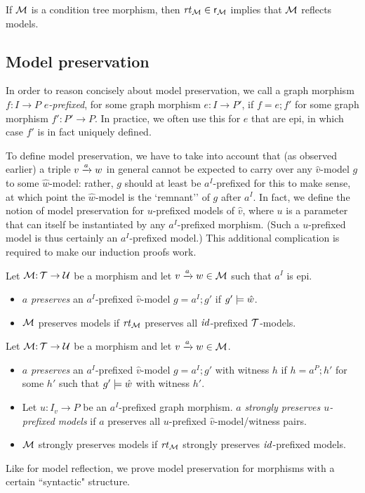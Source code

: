 \begin{corollary}
If ${\mathcal{M}}$ is a condition tree morphism, then $\mathit{rt}_{{\mathcal{M}}}\in {\mathsf{r}}_{\mathcal{M}}$ implies that ${\mathcal{M}}$ reflects models.
\end{corollary}

\subsection{Model preservation}

In order to reason concisely about model preservation, we call a graph morphism $f:I\to P$ \emph{$e$-prefixed}, for some graph morphism $e:I\to P'$, if $f=e;f'$ for some graph morphism $f':P'\to P$. In practice, we often use this for $e$ that are epi, in which case $f'$ is in fact uniquely defined.

To define model preservation, we have to take into account that (as observed earlier) a triple ${v}\xrightarrow{a}{w}$ in general cannot be expected to carry over any $\hat v$-model $g$ to some $\hat w$-model: rather, $g$ should at least be $a^I$-prefixed for this to make sense, at which point the $\hat w$-model is the `remnant'' of $g$ after $a^I$. In fact, we define the notion of model preservation for $u$-prefixed models of $\hat v$, where $u$ is a parameter that can itself be instantiated by any $a^I$-prefixed morphism. (Such a $u$-prefixed model is thus certainly an $a^I$-prefixed model.) This additional complication is required to make our induction proofs work.
%
\begin{definition}
Let ${\mathcal{M}}{:}\, {\mathcal{T}}\rightarrow{\mathcal{U}}$ be a morphism and let ${v}\xrightarrow{a}{w}\in{\mathcal{M}}$ such that $a^I$ is epi.
\begin{itemize}[topsep=\smallskipamount]
\item $a$ \emph{preserves} an $a^I$-prefixed $\hat v$-model $g=a^I;g'$ if $g'\models \hat w$.
		
\item ${\mathcal{M}}$ preserves models if $\mathit{rt}_{{\mathcal{M}}}$ preserves all ${\mathit{id}}$-prefixed ${\mathcal{T}}$-models.
\end{itemize}
\end{definition}
%
\begin{definition}
Let ${\mathcal{M}}{:}\, {\mathcal{T}}\rightarrow{\mathcal{U}}$ be a morphism and let ${v}\xrightarrow{a}{w}\in{\mathcal{M}}$.
\begin{itemize}[topsep=\smallskipamount]
\item $a$ \emph{preserves} an $a^I$-prefixed $\hat v$-model $g=a^I;g'$ with witness $h$ if $h=a^P;h'$ for some $h'$ such that $g'\models \hat w$ with witness $h'$.
		
\item Let $u:I_v\to P$ be an $a^I$-prefixed graph morphism. $a$ \emph{strongly preserves $u$-prefixed models} if $a$ preserves all $u$-prefixed $\hat v$-model/witness pairs.
		
\item ${\mathcal{M}}$ strongly preserves models if $\mathit{rt}_{{\mathcal{M}}}$ strongly preserves ${\mathit{id}}$-prefixed models.
\end{itemize}
\end{definition}
%
Like for model reflection, we prove model preservation for morphisms with a certain ``syntactic" structure.

